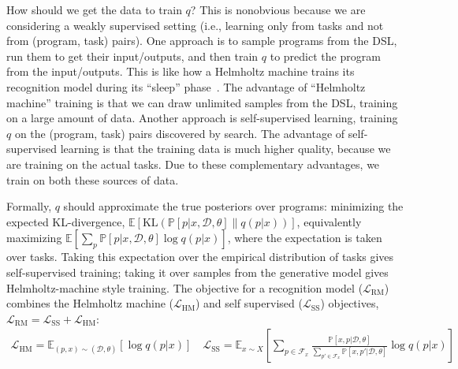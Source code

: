 \documentclass{article}
\newcommand{\system}{\textsc{SCC} }
\newcommand{\expect}{\mathds{E}} %
\newcommand{\probability}{\mathds{P}} %
\begin{document}
How should we get the data to train $q$?
This is nonobvious  because we are considering a weakly supervised setting (i.e., learning only from tasks and not from (program, task) pairs).
One approach is to sample programs from the DSL,
run them to get their input/outputs,
and then train $q$ to predict the program from the input/outputs.
This is like how a Helmholtz machine
trains its recognition model during its ``sleep'' phase~\cite{dayan1995helmholtz}.
The advantage of ``Helmholtz machine'' training is that
we can draw unlimited samples from the DSL,
training on a large amount of data.
Another approach is
 self-supervised learning,
training $q$ on the (program, task)
pairs discovered by search.
The advantage of self-supervised learning
is that the training data is much higher quality,
because we are training on the actual tasks.
Due to these complementary advantages,
we train on both these sources of data.

Formally, $q$ should approximate the true posteriors over programs: minimizing the expected KL-divergence, $  \expect\left[\text{KL}\left(\probability[p|x,\mathcal{D},\theta]\|q(p|x) \right) \right]$,
 equivalently maximizing $  \expect[\sum_p\probability[p|x,\mathcal{D},\theta]\log q(p|x) ]$,
 where the expectation is taken over tasks. Taking this expectation over the empirical distribution of tasks gives self-supervised training; taking it over samples from the generative model gives  Helmholtz-machine style training.
 The  objective for a recognition model ($\mathcal{L}_{\text{RM}}$) combines the Helmholtz machine ($\mathcal{L}_{\text{HM}}$) and self supervised ($\mathcal{L}_{\text{SS}}$) objectives, $\mathcal{L}_{\text{RM}} = \mathcal{L}_\text{SS} + \mathcal{L}_\text{HM}$:
\begin{align}\nonumber
\mathcal{L}_{\text{HM}} = \expect_{(p,x)\sim(\mathcal{D},\theta) }\left[\log q(p|x)\right]\quad
\mathcal{L}_{\text{SS}} = \expect_{x\sim X}\left[\sum_{p\in \mathcal{F}_x}
  \frac{\probability\left[x,p|\mathcal{D},\theta \right]}{\sum_{p'\in \mathcal{F}_x}\probability\left[x,p'|\mathcal{D},\theta \right]}\log q(p|x)\right]
\end{align}

\end{document}
